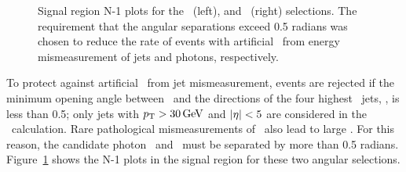 \begin{figure}[htbp]
  \centering
  \caption{
    Signal region N-1 plots for the \mindphijmet\ (left), and \dphigmet\ (right) selections.
    The requirement that the angular separations exceed 0.5 radians was chosen to reduce the rate of events with artificial \met\ from energy mismeasurement of jets and photons, respectively.
  }
  \label{fig:n-1}
\end{figure}

To protect against artificial \met\ from jet mismeasurement, events are rejected if the minimum opening angle between \ptvecmiss\ and the directions of the four highest \pt\ jets, \mindphijmet, is less than 0.5; only jets with $p_{\mathrm{T}} > 30\,\text{Ge\hspace{-.08em}V}$ and $\lvert \eta \rvert < 5$ are considered in the \mindphijmet\ calculation. 
Rare pathological mismeasurements of \ETg\ also lead to large \met. 
For this reason, the candidate photon \ptvec\ and \ptvecmiss\ must be separated by more than 0.5 radians.
Figure~\ref{fig:n-1} shows the N-1 plots in the signal region for these two angular selections.

